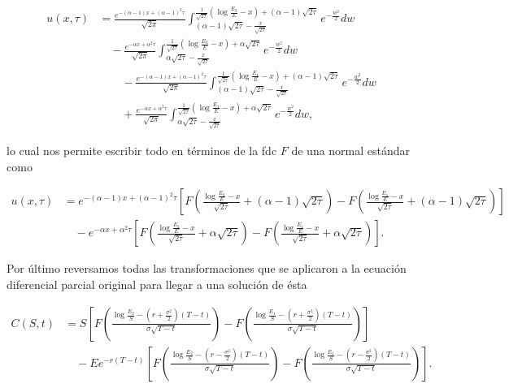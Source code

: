\documentclass[letter]{article}
\begin{document}
\begin{enumerate}
\begin{enumerate}[label=\alph*)]
\begin{align*}
    u(x,\tau) &= \frac{e^{-(\alpha - 1)x + (\alpha - 1)^2\tau}}{\sqrt{2\pi}} \int_{(\alpha - 1)\sqrt{2\tau} - \frac{x}{\sqrt{2\tau}}}^{\frac{1}{\sqrt{2\tau}}\left(\log\frac{E_2}{E} - x\right) + (\alpha - 1)\sqrt{2\tau}} e^{-\frac{w^2}{2}}dw\\
    &\quad - \frac{e^{-\alpha x + \alpha^2\tau}}{\sqrt{2\pi}}\int_{\alpha\sqrt{2\tau} - \frac{x}{\sqrt{2\tau}}}^{\frac{1}{\sqrt{2\tau}}\left(\log\frac{E_2}{E} - x\right) + \alpha\sqrt{2\tau}} e^{-\frac{w^2}{2}}dw\\
    &\qquad - \frac{e^{-(\alpha - 1)x + (\alpha - 1)^2\tau}}{\sqrt{2\pi}} \int_{(\alpha - 1)\sqrt{2\tau} - \frac{x}{\sqrt{2\tau}}}^{\frac{1}{\sqrt{2\tau}}\left(\log\frac{E_1}{E} - x\right) + (\alpha - 1)\sqrt{2\tau}} e^{-\frac{w^2}{2}}dw\\
    &\qquad + \frac{e^{-\alpha x + \alpha^2\tau}}{\sqrt{2\pi}} \int_{\alpha\sqrt{2\tau} - \frac{x}{\sqrt{2\tau}}}^{\frac{1}{\sqrt{2\tau}}\left(\log\frac{E_1}{E} - x\right) + \alpha\sqrt{2\tau}} e^{-\frac{w^2}{2}}dw,
\end{align*}

lo cual nos permite escribir todo en términos de la fdc $F$ de una normal estándar como

\begin{align*}
    u(x,\tau) &= e^{-(\alpha - 1)x + (\alpha - 1)^2\tau}\left[F\left(\frac{\log\frac{E_2}{E} - x}{\sqrt{2\tau}} + (\alpha - 1)\sqrt{2\tau}\right) - F\left(\frac{\log\frac{E_1}{E} - x}{\sqrt{2\tau}} + (\alpha - 1)\sqrt{2\tau}\right)\right]\\
    &\quad - e^{-\alpha x + \alpha^2\tau}\left[F\left(\frac{\log\frac{E_2}{E} - x}{\sqrt{2\tau}} + \alpha\sqrt{2\tau}\right) - F\left(\frac{\log\frac{E_1}{E} - x}{\sqrt{2\tau}} + \alpha\sqrt{2\tau}\right)\right].
\end{align*}

Por último reversamos todas las transformaciones que se aplicaron a la ecuación diferencial parcial original para llegar a una solución de ésta

\begin{align*}
    C(S,t) &= S\left[F\left(\frac{\log\frac{E_2}{S} - \left(r + \frac{\sigma^2}{2}\right)(T - t)}{\sigma\sqrt{T - t}}\right) - F\left(\frac{\log\frac{E_1}{S} - \left(r + \frac{\sigma^2}{2}\right)(T - t)}{\sigma\sqrt{T - t}}\right)\right]\\
    &\quad - Ee^{-r(T - t)}\left[F\left(\frac{\log\frac{E_2}{S} - \left(r - \frac{\sigma^2}{2}\right)(T - t)}{\sigma\sqrt{T - t}}\right) - F\left(\frac{\log\frac{E_1}{S} - \left(r - \frac{\sigma^2}{2}\right)(T - t)}{\sigma\sqrt{T - t}}\right)\right].
\end{align*}


\end{enumerate}
\end{enumerate}
\end{document}
